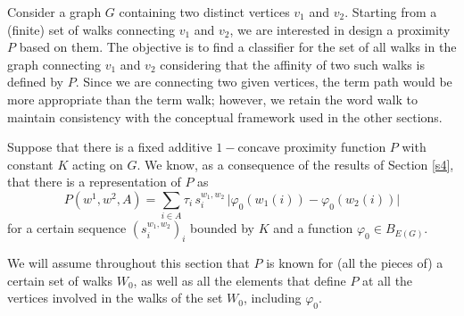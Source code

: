 \documentclass[preprint,12pt]{elsarticle}
\begin{document}
Consider a graph $G$ containing two distinct vertices $v_1$ and $v_2$. Starting from a (finite) set of walks connecting $v_1$ and $v_2$, we are interested in design a proximity $P$ based on them. The objective is to find a classifier for the set of all walks in the graph connecting $v_1$ and $v_2$ considering that the affinity of two such walks is defined by $P$. Since we are connecting two given vertices, the term path would be more appropriate than the term walk; however, we retain the word walk to maintain consistency with the conceptual framework used in the other sections.

Suppose that there is a fixed additive $1-$concave proximity function $P$ with constant $K$ acting on $G.$ 
We know, as a consequence of the results of Section \ref{s4}, that there is a representation of $P$ as
$$
P(w^1,w^2, A) = \sum_{i \in A} \tau_i \, s^{w_1,w_2}_i \, \big| \varphi_0(w_1(i))- \varphi_0(w_2(i)) \big|
$$
for a certain sequence $(s^{w_1,w_2}_i)_i$ bounded by $K$ and a function $\varphi_0 \in B_{E(G)}.$ 

We will assume throughout this section that $P$ is known for (all the pieces of) a certain set of walks $W_0$, as well as all the elements that define $P$ at all the vertices involved in the walks of the set $W_0$, including $\varphi_0$.
\end{document}
